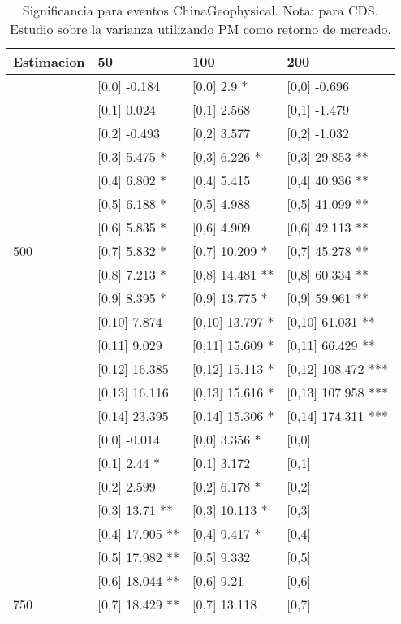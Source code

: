 \begin{table}

\caption{Significancia para eventos ChinaGeophysical. Nota: para CDS. Estudio sobre la varianza utilizando PM como retorno de mercado.}
\centering
\begin{tabular}[t]{llll}
\toprule
Estimacion & 50 & 100 & 200\\
\midrule
 & {}[0,0] -0.184 & {}[0,0] 2.9 * & {}[0,0] -0.696\\
 & {}[0,1] 0.024 & {}[0,1] 2.568 & {}[0,1] -1.479\\
 & {}[0,2] -0.493 & {}[0,2] 3.577 & {}[0,2] -1.032\\
 & {}[0,3] 5.475 * & {}[0,3] 6.226 * & {}[0,3] 29.853 **\\
 & {}[0,4] 6.802 * & {}[0,4] 5.415 & {}[0,4] 40.936 **\\
\addlinespace
 & {}[0,5] 6.188 * & {}[0,5] 4.988 & {}[0,5] 41.099 **\\
 & {}[0,6] 5.835 * & {}[0,6] 4.909 & {}[0,6] 42.113 **\\
500 & {}[0,7] 5.832 * & {}[0,7] 10.209 * & {}[0,7] 45.278 **\\
 & {}[0,8] 7.213 * & {}[0,8] 14.481 ** & {}[0,8] 60.334 **\\
 & {}[0,9] 8.395 * & {}[0,9] 13.775 * & {}[0,9] 59.961 **\\
\addlinespace
 & {}[0,10] 7.874 & {}[0,10] 13.797 * & {}[0,10] 61.031 **\\
 & {}[0,11] 9.029 & {}[0,11] 15.609 * & {}[0,11] 66.429 **\\
 & {}[0,12] 16.385 & {}[0,12] 15.113 * & {}[0,12] 108.472 ***\\
 & {}[0,13] 16.116 & {}[0,13] 15.616 * & {}[0,13] 107.958 ***\\
 & {}[0,14] 23.395 & {}[0,14] 15.306 * & {}[0,14] 174.311 ***\\
\addlinespace
 & {}[0,0] -0.014 & {}[0,0] 3.356 * & {}[0,0]\\
 & {}[0,1] 2.44 * & {}[0,1] 3.172 & {}[0,1]\\
 & {}[0,2] 2.599 & {}[0,2] 6.178 * & {}[0,2]\\
 & {}[0,3] 13.71 ** & {}[0,3] 10.113 * & {}[0,3]\\
 & {}[0,4] 17.905 ** & {}[0,4] 9.417 * & {}[0,4]\\
\addlinespace
 & {}[0,5] 17.982 ** & {}[0,5] 9.332 & {}[0,5]\\
 & {}[0,6] 18.044 ** & {}[0,6] 9.21 & {}[0,6]\\
750 & {}[0,7] 18.429 ** & {}[0,7] 13.118 & {}[0,7]\\

\end{tabular}
\end{table}
